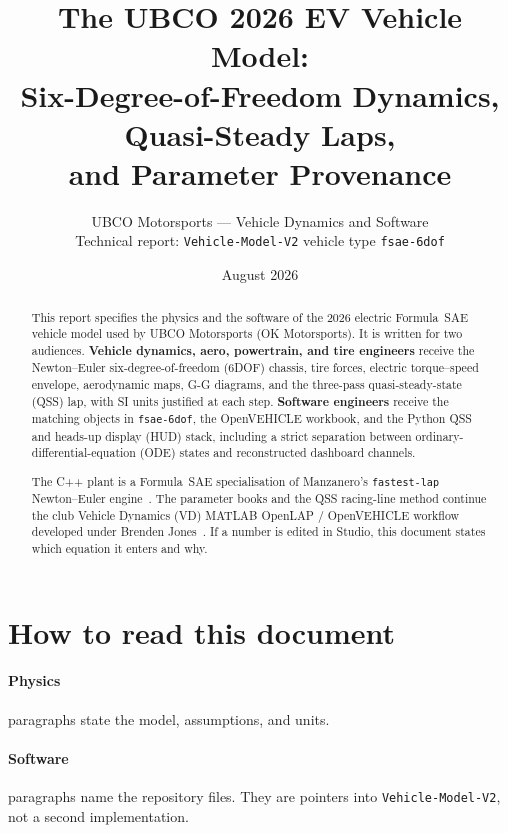 \documentclass[11pt,letterpaper]{article}
\title{%
  The UBCO 2026 EV Vehicle Model:\\
  Six-Degree-of-Freedom Dynamics, Quasi-Steady Laps,\\
  and Parameter Provenance%
}
\author{%
  UBCO Motorsports --- Vehicle Dynamics and Software\\
  Technical report: \texttt{Vehicle-Model-V2} \quad vehicle type \texttt{fsae-6dof}%
}
\date{August 2026}
\begin{document}
\maketitle

\begin{abstract}
This report specifies the physics and the software of the 2026 electric
Formula~SAE vehicle model used by UBCO Motorsports (OK Motorsports). It
is written for two audiences. \textbf{Vehicle dynamics, aero, powertrain,
and tire engineers} receive the Newton--Euler six-degree-of-freedom
(6DOF) chassis, tire forces, electric torque--speed envelope, aerodynamic
maps, G-G diagrams, and the three-pass quasi-steady-state (QSS) lap, with
SI units justified at each step. \textbf{Software engineers} receive the
matching objects in \texttt{fsae-6dof}, the OpenVEHICLE workbook, and the
Python QSS and heads-up display (HUD) stack, including a strict
separation between ordinary-differential-equation (ODE) states and
reconstructed dashboard channels.

The C++ plant is a Formula~SAE specialisation of Manzanero's
\texttt{fastest-lap} Newton--Euler engine~\cite{manzanero-fastestlap}.
The parameter books and the QSS racing-line method continue the club
Vehicle Dynamics (VD) MATLAB OpenLAP / OpenVEHICLE workflow developed
under Brenden Jones~\cite{jones-linkedin,openlap,lopesbandy-linkedin}.
If a number is edited in Studio, this document states which equation it
enters and why.
\end{abstract}

\tableofcontents
\newpage

\section{How to read this document}

\paragraph{Physics} paragraphs state the model, assumptions, and units.
\paragraph{Software} paragraphs name the repository files. They are
pointers into \texttt{Vehicle-Model-V2}, not a second implementation.
\end{document}
